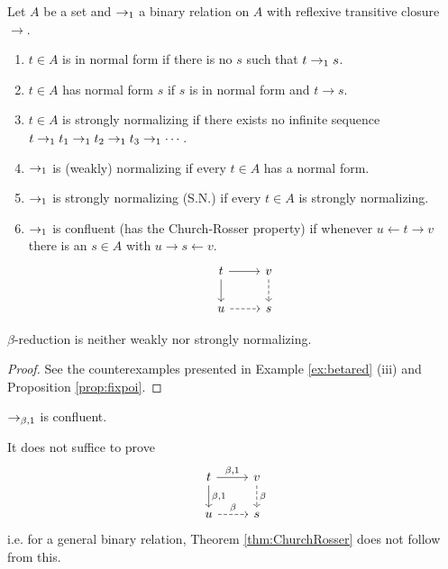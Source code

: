 \begin{boxdefi}
    Let $A$ be a set and $\to_1$ a binary relation on $A$ with reflexive transitive closure $\to$.
    \begin{enumerate}
        \item $t \in A$ is \alert{in normal form} if there is no $s$ such that $t \to_1 s$.
        \item $t \in A$ \alert{has normal form $s$} if $s$ is in normal form and $t \to s$.
        \item $t \in A$ is \alert{strongly normalizing} if there exists no infinite sequence $t \to_1 t_1 \to_1 t_2 \to_1 t_3 \to_1 \cdots$.
        \item $\to_1$ is \alert{(weakly) normalizing} if every $t \in A$ has a normal form.
        \item $\to_1$ is \alert{strongly normalizing (S.N.)} if every $t \in A$ is strongly normalizing.
        \item {$\to_1$ is \alert{confluent} (has the \alert{Church-Rosser property}) if whenever $u \leftarrow t \to v$ there is an $s \in A$ with $u \to s \leftarrow v$.
            \begin{equation*}
            \begin{tikzcd}[ampersand replacement=\&]
                t \ar[r] \ar[d] \& v \ar[d, dashed] \\
                u \ar[r, dashed] \& s
            \end{tikzcd}
        \end{equation*}}
    \end{enumerate}
\end{boxdefi}

\begin{rem}
    $\beta$-reduction is neither weakly nor strongly normalizing.
\end{rem}
\begin{proof}
    See the counterexamples presented in Example \ref{ex:betared} (iii) and Proposition \ref{prop:fixpoi}.
\end{proof}

\begin{boxthm} \label{thm:ChurchRosser}
    $\to_{\beta, 1}$ is confluent.
\end{boxthm}

\begin{rem}
    It does not suffice to prove
    \begin{equation*}
        \begin{tikzcd}
            t \ar[r, "{\beta, 1}"] \ar[d, "{\beta, 1}"] & v \ar[d, dashed, "\beta"] \\
            u \ar[r, dashed, "\beta"] & s
        \end{tikzcd}
    \end{equation*}
    i.e. for a general binary relation, Theorem \ref{thm:ChurchRosser} does not follow from this.
\end{rem}

